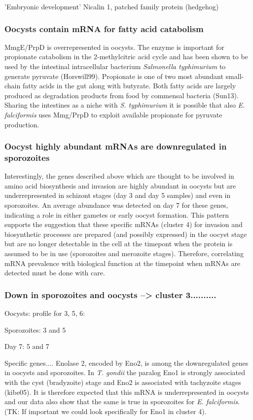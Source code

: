 \documentclass{bmcart}
\begin{document}
'Embryonic development'
Nicalin 1, patched family protein (hedgehog)  


\subsubsection*{Oocysts contain mRNA for fatty acid catabolism}
MmgE/PrpD is overrepresented in oocysts. The enzyme is important for propionate catabolism 
in the 2-methylcitric acid cycle and has been shown to be used by the 
intestinal intracellular bacterium \textit{Salmonella typhimurium} to generate 
pyruvate (Horswill99). 
Propionate is one of two most abundant small-chain fatty acids 
in the gut along with butyrate. Both fatty acids are largely produced as 
degradation products from food by commensal bacteria (Sun13). Sharing the intestines as a niche
with \textit{S. typhimurium} it is possible that also \textit{E. falciformis} uses Mmg/PrpD
to exploit available propionate for pyruvate production.

\subsubsection*{Oocyst highly abundant mRNAs are downregulated in sporozoites}
Interestingly, the genes described above which are thought to be involved in amino acid 
biosynthesis and invasion are highly abundant in oocysts but are underrepresented in schizont
stages (day 3 and day 5 samples) and even in sporozoites. An average abundance was detected on 
day 7 for these genes, indicating a role in either gametes or early oocyst formation.
This pattern supports the suggestion that these specific mRNAs (cluster 4) for invasion 
and biosynthetic processes are prepared (and possibly expressed) in the oocyst stage but 
are no longer detectable in the cell at the timepont when the protein is assumed to be 
in use (sporozoites and merozoite stages). 
Therefore, correlating mRNA prevalence with biological function at the timepoint when mRNAs 
are detected must be done with care. 

\subsubsection*{Down in sporozoites and oocysts -->  cluster 3..........}
Oocysts: profile for 3, 5, 6:

Sporozoites: 3 and 5

Day 7: 5 and 7

Specific genes....
Enolase 2, encoded by Eno2, is among the downregulated genes in oocysts and sporozoites.
In \textit{T. gondii} the paralog Eno1 is strongly associated with the cyst (bradyzoite) stage
and Eno2 is associated with tachyzoite stages (kibe05). It is therefore expected that this mRNA is
underrepresented in oocysts and our data also show that the same is true in sporozoites for
\textit{E. falciformis}. (TK: If important we could look specifically for Eno1 in cluster 4).
\end{document}
